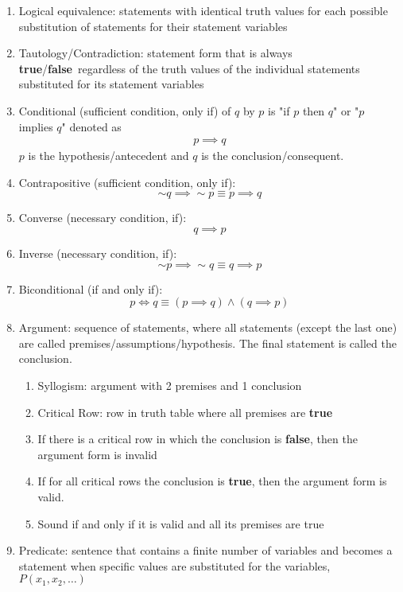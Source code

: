 \documentclass[landscape, a4paper]{article}
\newcommand{\true}{\textbf{true}}
\newcommand{\false}{\textbf{false}}
\renewcommand{\and}{\wedge}
\begin{document}
\begin{multicols*}{4}
\begin{enumerate}[wide, labelindent=2pt]
        \item Logical equivalence: statements with identical truth values for each possible substitution of statements for their statement variables
        \item Tautology/Contradiction: statement form that is always \true/\false\ regardless of the truth values of the individual statements substituted for its statement variables
        \item Conditional (sufficient condition, only if) of $q$ by $p$ is "if $p$ then $q$" or "$p$ implies $q$" denoted as
              \begin{align*}
                  p \implies q
              \end{align*}$p$ is the hypothesis/antecedent and $q$ is the conclusion/consequent.
        \item Contrapositive (sufficient condition, only if):
              \[{\sim} q \implies {\sim} p \equiv p \implies q\]
        \item Converse (necessary condition, if):
              \[q \implies p\]
        \item Inverse (necessary condition, if):
              \[{\sim} p \implies {\sim} q \equiv q \implies p\]
        \item Biconditional (if and only if):
              \[p \iff q\equiv (p\implies q) \and (q\implies p)\]
        \item Argument: sequence of statements, where all statements (except the last one) are called premises/assumptions/hypothesis. The final statement is called the conclusion.
              \begin{enumerate}
                  \item Syllogism: argument with 2 premises and 1 conclusion
                  \item Critical Row: row in truth table where all premises are \true
                  \item If there is a critical row in which the conclusion is \false, then the argument form is invalid
                  \item If for all critical rows the conclusion is \true, then the argument form is valid.
                  \item Sound if and only if it is valid and all its premises are true
              \end{enumerate}
        \item Predicate: sentence that contains a finite number of variables and becomes a statement when specific values are substituted for the variables, $P(x_1, x_2, \ldots)$

\end{enumerate}
\end{multicols*}
\end{document}
